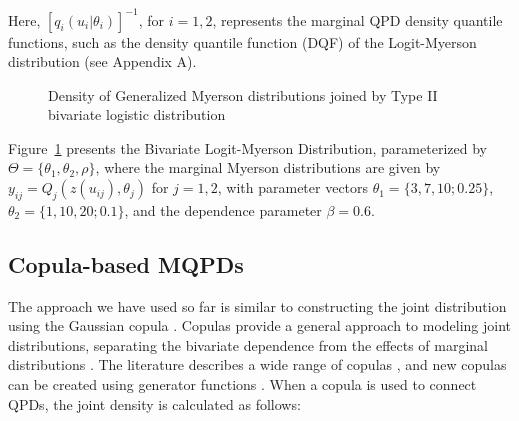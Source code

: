\documentclass[
  fleqn,
  deca,
  blindrev
]{informs4}
\begin{document}
Here, \([q_i(u_i\vert\theta_i)]^{-1}\), for \(i=1,2\), represents the
marginal QPD density quantile functions, such as the density quantile
function (DQF) of the Logit-Myerson distribution (see Appendix A).

\begin{figure}


\caption{\label{fig-bi-logitmyerson}Density of Generalized Myerson
distributions joined by Type II bivariate logistic distribution}

\end{figure}%

Figure~\ref{fig-bi-logitmyerson} presents the Bivariate Logit-Myerson
Distribution, parameterized by \(\Theta=\{\theta_1, \theta_2, \rho\}\),
where the marginal Myerson distributions are given by
\(y_{ij}=Q_j(z(u_{ij}),\theta_j)\) for \(j=1,2\), with parameter vectors
\(\theta_1=\{3,7,10;0.25\}\), \(\theta_2=\{1,10,20;0.1\}\), and the
dependence parameter \(\beta=0.6\).

\subsection{Copula-based MQPDs}\label{copula-based-mqpds}

The approach we have used so far is similar to constructing the joint
distribution using the Gaussian copula
\citep{hoff2007ExtendingRankLikelihood}. Copulas provide a general
approach to modeling joint distributions, separating the bivariate
dependence from the effects of marginal distributions
\citep{kurowicka2006UncertaintyAnalysisHigh}. The literature describes a
wide range of copulas
\citep{genest2007EverythingYouAlways, smith2013BayesianApproachesCopula, kurowicka2011DependenceModelingVine},
and new copulas can be created using generator functions
\citep{durrleman2000SimpleTransformationCopulas}. When a copula is used
to connect QPDs, the joint density is calculated as follows:
\end{document}
